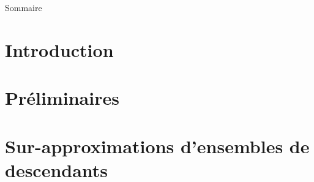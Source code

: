 \documentclass[xcolor={dvipsnames}]{beamer}
\begin{document}
\maketitle

\begin{frame}{Sommaire}
  \small \tableofcontents[hideallsubsections]
\end{frame} 

\section{Introduction}


\section{Préliminaires}


\section{Sur-approximations d'ensembles de descendants}
\end{document}

